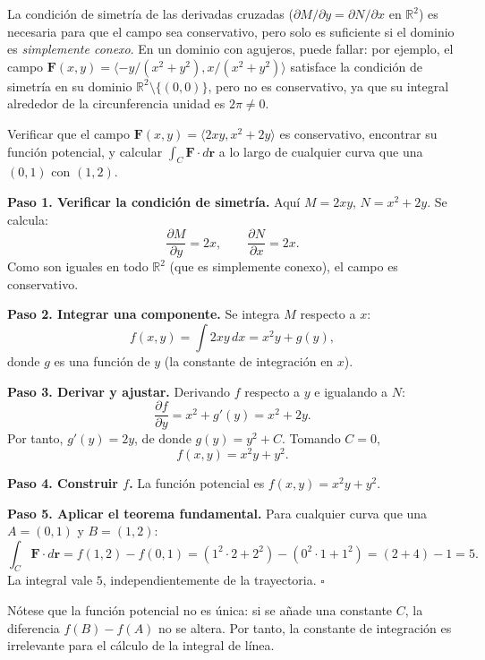 \begin{rem}
La condición de simetría de las derivadas cruzadas ($\partial M/\partial
y = \partial N/\partial x$ en $\mathbb{R}^2$) es necesaria para que el
campo sea conservativo, pero solo es suficiente si el dominio es
\emph{simplemente conexo}. En un dominio con agujeros, puede fallar:
por ejemplo, el campo $\mathbf{F}(x,y) = \langle -y/(x^2+y^2),
x/(x^2+y^2) \rangle$ satisface la condición de simetría en su dominio
$\mathbb{R}^2\setminus\{(0,0)\}$, pero no es conservativo, ya que su
integral alrededor de la circunferencia unidad es $2\pi \neq 0$.
\end{rem}

\begin{example}
Verificar que el campo $\mathbf{F}(x,y) = \langle 2xy, x^2 + 2y \rangle$
es conservativo, encontrar su función potencial, y calcular
$\int_C \mathbf{F}\cdot d\mathbf{r}$ a lo largo de cualquier curva que
una $(0,1)$ con $(1,2)$.
\end{example}

\begin{myproof}
\textbf{Paso 1. Verificar la condición de simetría.}
Aquí $M=2xy$, $N=x^2+2y$. Se calcula:
\[
\frac{\partial M}{\partial y} = 2x, \qquad
\frac{\partial N}{\partial x} = 2x.
\]
Como son iguales en todo $\mathbb{R}^2$ (que es simplemente conexo),
el campo es conservativo.

\textbf{Paso 2. Integrar una componente.}
Se integra $M$ respecto a $x$:
\[
f(x,y) = \int 2xy \, dx = x^2 y + g(y),
\]
donde $g$ es una función de $y$ (la constante de integración en $x$).

\textbf{Paso 3. Derivar y ajustar.}
Derivando $f$ respecto a $y$ e igualando a $N$:
\[
\frac{\partial f}{\partial y} = x^2 + g'(y) = x^2 + 2y.
\]
Por tanto, $g'(y) = 2y$, de donde $g(y) = y^2 + C$. Tomando $C=0$,
\[
f(x,y) = x^2 y + y^2.
\]

\textbf{Paso 4. Construir $f$.}
La función potencial es $f(x,y)=x^2 y + y^2$.

\textbf{Paso 5. Aplicar el teorema fundamental.}
Para cualquier curva que una $A=(0,1)$ y $B=(1,2)$:
\[
\int_C \mathbf{F}\cdot d\mathbf{r}
= f(1,2) - f(0,1)
= (1^2\cdot 2 + 2^2) - (0^2\cdot 1 + 1^2)
= (2+4) - 1 = 5.
\]
La integral vale $\boxed{5}$, independientemente de la trayectoria.
$\square$
\end{myproof}

\begin{rem}
Nótese que la función potencial no es única: si se añade una constante
$C$, la diferencia $f(B)-f(A)$ no se altera. Por tanto, la constante
de integración es irrelevante para el cálculo de la integral de línea.
\end{rem}

